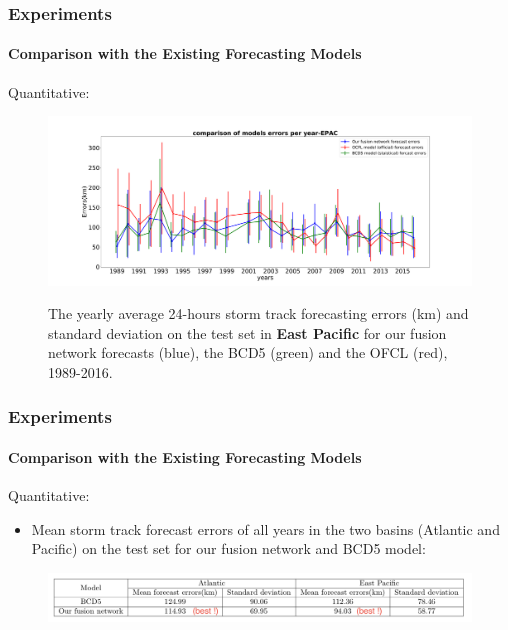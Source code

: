 \documentclass{beamer}
\begin{document}
\begin{frame}
\frametitle{Experiments}
\framesubtitle{Comparison with the Existing Forecasting Models}
Quantitative: 
\begin{figure}
	\includegraphics[width=1.0\linewidth]{figs/EPAC_comparison_of_models_errors_per_year.pdf}\\
	\caption{The yearly average 24-hours storm track forecasting errors (km) and standard deviation on the test set in \textbf{East Pacific} for our fusion network forecasts (blue), the BCD5 (green) and the OFCL (red), 1989-2016.}
\end{figure}
\end{frame}

\begin{frame}
\frametitle{Experiments}
\framesubtitle{Comparison with the Existing Forecasting Models}
Quantitative: \\
\begin{itemize}
	\item Mean storm track forecast errors of all years in the two basins (Atlantic and Pacific) on the test set for our fusion network and BCD5 model: 
\end{itemize}

\begin{figure}
	\includegraphics[width=1.0\linewidth]{figs/compare_with_baseline}\\
\end{figure}
\end{frame}
\end{document}

